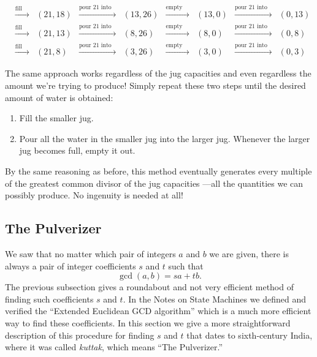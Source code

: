 \[\begin{array}{ccccccccc}
& \xrightarrow{\text{fill 21}} & (21,18)& \xrightarrow{\text{pour 21 into 26}} & (13,26)& \xrightarrow{\text{empty 26}} & (13,0)& \xrightarrow{\text{pour 21 into 26}} & (0,13)\\
& \xrightarrow{\text{fill 21}} & (21,13)& \xrightarrow{\text{pour 21 into 26}} & (8,26)& \xrightarrow{\text{empty 26}} & (8,0)& \xrightarrow{\text{pour 21 into 26}} & (0,8)\\
& \xrightarrow{\text{fill 21}} & (21,8)& \xrightarrow{\text{pour 21 into 26}} & (3,26)& \xrightarrow{\text{empty 26}} & (3,0)& \xrightarrow{\text{pour 21 into 26}} & (0,3)
\end{array}
\]
%

The same approach works regardless of the jug capacities and even
regardless the amount we're trying to produce!  Simply repeat these two
steps until the desired amount of water is obtained:
\begin{enumerate}
\item Fill the smaller jug.
\item Pour all the water in the smaller jug into the larger jug.
Whenever the larger jug becomes full, empty it out.
\end{enumerate}

By the same reasoning as before, this method eventually generates every
multiple of the greatest common divisor of the jug capacities ---all the
quantities we can possibly produce.  No ingenuity is needed at all!


\subsection{The Pulverizer}
\label{sec:pulverizer}

We saw that no matter which pair of integers $a$ and $b$ we
are given, there is always a pair of integer coefficients $s$ and $t$
such that     
\[
\gcd(a, b)  =  s a + t b.
\]
The previous subsection gives a roundabout and not very efficient method
of finding such coefficients $s$ and $t$.  In the Notes on State Machines
we defined and verified the ``Extended Euclidean GCD algorithm'' which is
a much more efficient way to find these coefficients.  In this section we
give a more straightforward description of this procedure for finding $s$
and $t$ that dates to sixth-century India, where it was called {\em
kuttak}, which means ``The Pulverizer.''

